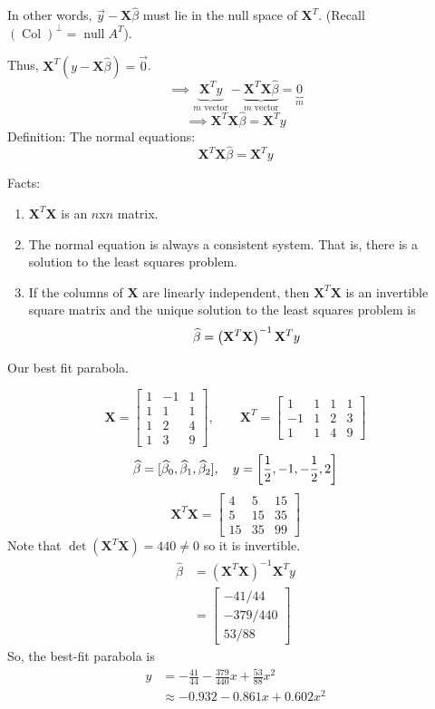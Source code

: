 \nl In other words, $\vec y - \mathbf X \widehat{\beta}$ must lie in the null space of $\mathbf X ^T$. (Recall $(\operatorname{Col} )^{\perp} = \operatorname{null}A^T$).

\nl Thus, $\mathbf X^T (y - \mathbf X \widehat{\beta}) = \vec 0$. 
$$\implies \underbrace{\mathbf X^T y}_{m \text{ vector}} - \underbrace{\mathbf X^T \mathbf X \widehat{\beta}}_{m \text{ vector}} = \underbrace{0}_{m}$$
$$\implies \mathbf X^T \mathbf X \widehat{\beta} = \mathbf X^T y$$
Definition: The normal equations:
$$\mathbf X^T \mathbf X \widehat{\beta} = \mathbf X^T y$$

\nl Facts:
\begin{enumerate}[label=\textcircled{\raisebox{-1pt}{\arabic*}}]
    \item $\mathbf X^T \mathbf X$ is an $n$x$n$ matrix.
    \item The normal equation is always a consistent system. That is, there is a solution to the least squares problem.
    \item If the columns of $\mathbf X$ are linearly independent, then $\mathbf X^T \mathbf X$ is an invertible square matrix and the unique solution to the least squares problem is
    $$\widehat{\beta} = \pars{\mathbf X^T \mathbf X}^{-1}\mathbf X^T y$$ 
\end{enumerate}

\example Our best fit parabola. 

$$\mathbf X = \begin{bmatrix}
    1 & -1 & 1\\ 1 & 1 & 1 \\ 1 & 2 & 4 \\ 1 & 3 & 9
\end{bmatrix}, \qquad \mathbf X^T = \begin{bmatrix}
    1 & 1 & 1 & 1\\ -1 & 1 & 2 & 3 \\ 1 & 1 & 4 & 9
\end{bmatrix}$$
$$\widehat{\beta} = [\widehat{\beta}_0, \widehat{\beta}_1, \widehat{\beta}_2], \quad y = \brac{ \over{2}, -1, -\over2, 2 }$$
$$\mathbf X^T \mathbf X = \begin{bmatrix}
    4 & 5 & 15\\ 5 & 15 & 35 \\ 15 & 35 & 99
\end{bmatrix}$$
Note that $\operatorname{det} (\mathbf X^T \mathbf X ) = 440 \neq 0$ so it is invertible. 
\begin{align*}
    \widehat{\beta} &= (\mathbf X^T \mathbf X )^{-1} \mathbf X^T y\\
    &= \begin{bmatrix}
        -41/44\\ -379/440 \\ 53/88
    \end{bmatrix}
\end{align*}
So, the best-fit parabola is 
\begin{align*}
    y &= -\frac{41}{44} - \frac{379}{440}x + \frac{53}{88}x^2\\
    &\approx -0.932 - 0.861x +0.602x^2
\end{align*}


